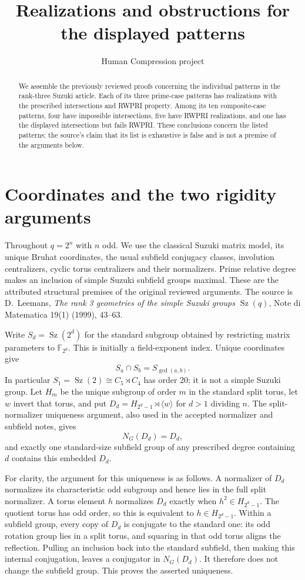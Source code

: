 \documentclass[11pt,a4paper]{article}
\title{Realizations and obstructions for the displayed patterns}
\author{Human Compression project}\date{}
\newcommand{\Sz}{\operatorname{Sz}}\newcommand{\F}{\mathbb F}
\newcommand{\gen}[1]{\langle#1\rangle}
\begin{document}
\maketitle
\begin{abstract}
We assemble the previously reviewed proofs concerning the individual
patterns in the rank-three Suzuki article. Each of its three prime-case
patterns has realizations with the prescribed intersections and RWPRI
property. Among its ten composite-case patterns, four have impossible
intersections, five have RWPRI realizations, and one has the displayed
intersections but fails RWPRI. These conclusions concern the listed
patterns; the source's claim that its list is exhaustive is false and
is not a premise of the arguments below.
\end{abstract}

\section{Coordinates and the two rigidity arguments}
Throughout $q=2^n$ with $n$ odd. We use the classical Suzuki matrix
model, its unique Bruhat coordinates, the usual subfield conjugacy
classes, involution centralizers, cyclic torus centralizers and their
normalizers. Prime relative degree makes an inclusion of simple Suzuki
subfield groups maximal. These are the attributed structural premises
of the original reviewed arguments. The source is D.~Leemans,
\emph{The rank 3 geometries of the simple Suzuki groups $\Sz(q)$},
Note di Matematica 19(1) (1999), 43--63.

Write $S_d=\Sz(2^d)$ for the standard subgroup obtained by restricting
matrix parameters to $\F_{2^d}$. This is initially a field-exponent
index. Unique coordinates give
\[
 S_a\cap S_b=S_{\gcd(a,b)}.
\]
In particular $S_1=\Sz(2)\cong C_5\rtimes C_4$ has order 20; it is
not a simple Suzuki group. Let $H_m$ be the unique subgroup of order
$m$ in the standard split torus, let $w$ invert that torus, and put
$D_d=H_{2^d-1}\rtimes\gen w$ for $d>1$ dividing $n$.
The split-normalizer uniqueness argument, also used in the accepted
normalizer and subfield notes, gives
\[
 N_G(D_d)=D_d,
\]
and exactly one standard-size subfield group of any prescribed degree
containing $d$ contains this embedded $D_d$.

For clarity, the argument for this uniqueness is as follows. A normalizer
of $D_d$ normalizes its characteristic odd subgroup and hence lies in
the full split normalizer. A torus element $h$ normalizes $D_d$ exactly
when $h^2\in H_{2^d-1}$. The quotient torus has odd order, so this is
equivalent to $h\in H_{2^d-1}$. Within a subfield group, every copy of
$D_d$ is conjugate to the standard one: its odd rotation group lies in
a split torus, and squaring in that odd torus aligns the reflection.
Pulling an inclusion back into the standard subfield, then making this
internal conjugation, leaves a conjugator in $N_G(D_d)$. It therefore
does not change the subfield group. This proves the asserted uniqueness.
\end{document}
